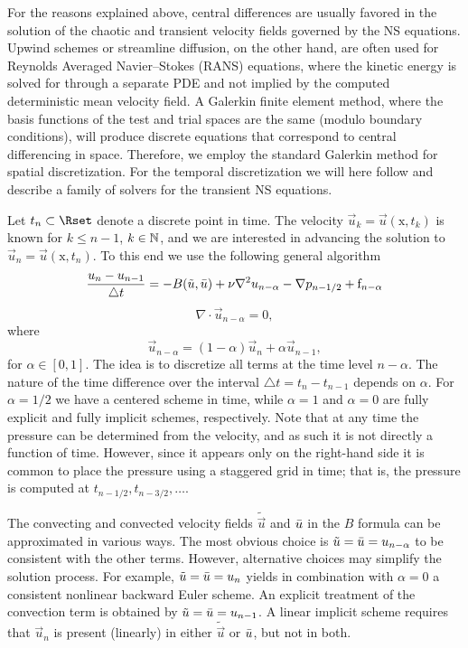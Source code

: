 For the reasons explained above, central differences are usually
favored in the solution of the chaotic and transient velocity fields
governed by the NS equations. Upwind schemes or streamline diffusion,
on the other hand, are often used for Reynolds Averaged Navier--Stokes
(RANS) equations, where the kinetic energy is solved for through a
separate PDE and not implied by the computed deterministic mean
velocity field. A Galerkin finite element method, where the basis
functions of the test and trial spaces are the same (modulo boundary
conditions), will produce discrete equations that correspond to
central differencing in space. Therefore, we employ the standard
Galerkin method for spatial discretization. For the temporal
discretization we will here follow
\citet{SimoArmero1994} and describe a family of solvers for the
transient NS equations.

Let $t_n \subset \Rset$ denote a discrete point in time. The velocity
$\vec{u}_k=\vec{u}(\text{x},t_k)$ is known for $k\leqslant n-1$, $k \in
\Nset$, and we are interested in advancing the solution to
$\vec{u}_{n}=\vec{u}(\text{x},t_{n})$. To this end we use the
following general algorithm
\begin{equation}
\label{eq:mortensen:NS_d} \frac{\vec{u}_{n}-\vec{u}_{n-1}}{\triangle t} = - B(\tilde{\vec{u}},\Bar{\vec{u}}) + \nu \nabla^2 \vec{u}_{n-\alpha} -\nabla p_{n-1/2} + \text{f}_{n-\alpha}
\end{equation}
\begin{equation}
 \label{eq:mortensen:cont_d} \nabla \cdot \vec{u}_{n-\alpha} =0,
\end{equation}
where
\begin{equation}
   \vec{u}_{n-\alpha}=(1-\alpha) \vec{u}_{n} + \alpha \vec{u}_{n-1},
\end{equation}
for $\alpha \in [0,1]$.  The idea is to discretize all terms at the
time level $n-\alpha$. The nature of the time difference over the
interval $\triangle t = t_{n}-t_{n-1}$ depends on $\alpha$. For
$\alpha =1/2$ we have a centered scheme in time, while $\alpha =1$ and
$\alpha=0$ are fully explicit and fully implicit schemes,
respectively. Note that at any time the pressure can be determined
from the velocity, and as such it is not directly a function of
time. However, since it appears only on the right-hand side it is
common to place the pressure using a staggered grid in time; that is,
the pressure is computed at $t_{n-1/2}, t_{n-3/2}, \ldots$.

The convecting and convected velocity fields $\tilde{\vec{u}}$ and
$\Bar{\vec{u}}$ in the $B$ formula can be approximated in various
ways. The most obvious choice is
$\tilde{\vec{u}}=\Bar{\vec{u}}=\vec{u}_{n-\alpha}$ to be
consistent with the other terms. However, alternative choices may
simplify the solution process. For example,
$\tilde{\vec{u}}=\Bar{\vec{u}}=\vec{u}_{n}$ yields in combination
with $\alpha=0$ a consistent nonlinear backward Euler scheme. An
explicit treatment of the convection term is obtained by
$\tilde{\vec{u}} = \Bar{\vec{u}} = \vec{u}_{n-1}$.  A linear
implicit scheme requires that $\vec{u}_{n}$ is present (linearly) in
either $\tilde{\vec{u}}$ or $\Bar{\vec{u}}$, but not in both.

